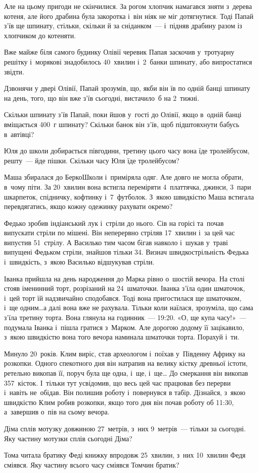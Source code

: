 Але на цьому пригоди не скінчилися. За рогом хлопчик намагався зняти
з~дерева котеня, але його драбина була закоротка і~він ніяк не міг
дотягнутися. Тоді Папай з’їв ще шпинату, стільки, скільки й
за сніданком~--- і~підняв драбину разом із хлопчиком до котеняти.

Вже майже біля самого будинку Олівії черевик Папая заскочив у~тротуарну
решітку і~морякові знадобилось 40~хвилин і~2~банки шпинату,
або випростатися звідти.

Дзвонячи у двері Олівії, Папай зрозумів, що, якби він їв по одній
банці шпинату на день, того, що він вже з’їв сьогодні,
вистачило~б на 2~тижні.

Скільки шпинату з’їв Папай, поки йшов у~гості до Олівії, якщо в~одній
банці вміщається 400~г шпинату?
Скільки банок він з’їв, щоб підштовхнути бабусь в~автівці?


\problem
Юля до школи добирається півгодини,
третину цього часу вона їде тролейбусом, решту~--- йде пішки.
Скільки часу Юля їде тролейбусом?


\problem
Маша збиралася до БеркоШколи і~приміряла одяг.
Але довго не могла обрати, в~чому піти.
За 20~хвилин вона встигла переміряти 4~платтячка, джинси, 3~пари шкарпеток,
спідничку, кофтинку і~7~футболок.
З~якою швидкістю Маша встигала перевдягатись,
якщо кожну одежинку рахувати окремо?


\problem
Федько зробив індіанський лук і~стріли до нього.
Сів на горісі та~почав випускати стріли по мішені.
Він неперервно стріляв 17~хвилин і~за цей час випустив 51~стрілу.
А Василько тим часом бігав навколо і~шукав у~траві випущені Федьком стріли,
знайшов тільки 34.
Визнач швидкострільність Федька і~швидкість, з~якою Василько
відшукував стріли.


\problem
Іванка прийшла на день народження до Марка рівно о~шостій вечора.
На столі стояв іменинний торт, розрізаний на 24~шматочки.
Іванка з’їла один шматочок, і~цей торт їй надзвичайно сподобався.
Тоді вона пригостилася ще шматочком, і~ще одним\ldots  а далі вона вже не рахувала.
Тільки коли наїлася, зрозуміла, що сама з’їла третину торта.
Вона глянула на годинник~--- 19:20.
«О, ще купа часу!»~--- подумала Іванка і~пішла гратися з~Марком.
Але дорогою додому її зацікавило, з~якою швидкістю вона того
вечора наминала шматочки торта. Порахуй і~ти.


\problem
Минуло 20~років. Клим виріс, став археологом і~поїхав у~Південну Африку
на розкопки. Одного спекотного дня він натрапив на велику кістку
древньої істоти, ретельно викопав її, поруч була ще одна, і~ще, і~ще\ldots
До смеркання він викопав 357~кісток. І~тільки тут усвідомив, що весь
цей час працював без перерви і~навіть не~обідав. Він полишив роботу
і~повернувся в табір. Дізнайся, з~якою швидкістю Клим робив розкопки,
якщо того дня він почав роботу об 11:30, а~завершив о~пів на сьому вечора.


\problem
Діма сплів мотузку довжиною 27~метрів, з~них 9~метрів~--- тільки за сьогодні.
Яку частину мотузки сплів сьогодні Діма?


\problem
Тома читала братику Феді книжку впродовж 25~хвилин,
з~них 10~хвилин Федя сміявся.
Яку частину всього часу сміявся Томчин братик?
